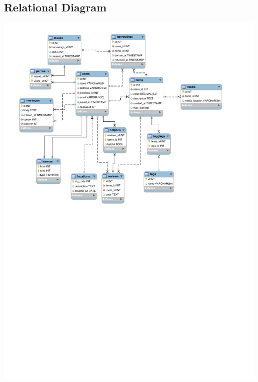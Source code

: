 \documentclass[12pt]{article}
\begin{document}
\subsection*{Relational Diagram}
\includegraphics[trim=0in 4in 0in 0in,clip=true,width=8in]{EECS341Relational.pdf}
\end{document}
